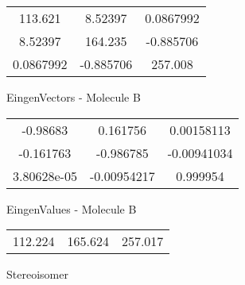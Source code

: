 \begin{multicols}{2}
\begin{center}
\begin{tabular}{|c c c|}
113.621	 & 	8.52397	 & 	0.0867992	 \\
8.52397	 & 	164.235	 & 	-0.885706	 \\
0.0867992	 & 	-0.885706	 & 	257.008
\end{tabular}

\vtab
 EingenVectors - Molecule B     \\
\vtab
\begin{tabular}{|c c c|}
-0.98683	 & 	0.161756	 & 	0.00158113	 \\
-0.161763	 & 	-0.986785	 & 	-0.00941034	 \\
3.80628e-05	 & 	-0.00954217	 & 	0.999954
\end{tabular}

\vtab
 EingenValues - Molecule B     \\
\vtab
\begin{tabular}{|c c c|}
112.224	 & 	165.624	 & 	257.017	 \\
\end{tabular}

\end{center}
\end{multicols}
\begin{center}
\vtab
\vtab
\textcolor{NavyBlue}{\Large Stereoisomer}
\end{center}

 \newpage

